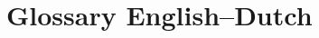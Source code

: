 \chapter{Glossary English--Dutch}
\label{apxGlossary}
\renewcommand\chaptername{Glossary English--Dutch}


